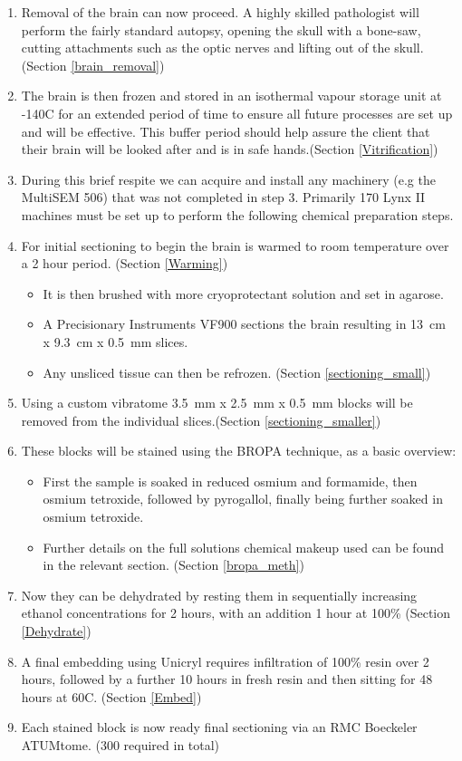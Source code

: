 \documentclass[a4paper, 11pt]{article}
\numberwithin{equation}{section}
\begin{document}
\begin{enumerate}
	
	\item Removal of the brain can now proceed. A highly skilled pathologist will perform the fairly standard autopsy, opening the skull with a bone-saw, cutting attachments such as the optic nerves and lifting out of the skull. (Section \ref{brain_removal})
	\item The brain is then frozen and stored in an isothermal vapour storage unit at -140\degree C for an extended period of time to ensure all future processes are set up and will be effective. This buffer period should help assure the client that their brain will be looked after and is in safe hands.(Section \ref{Vitrification})
	\item During this brief respite we can acquire and install any machinery (e.g the MultiSEM 506) that was not completed in step 3. Primarily 170 Lynx II machines must be set up to perform the following chemical preparation steps.
	
	\item For initial sectioning to begin the brain is warmed to room temperature over a 2 hour period. (Section \ref{Warming})
	\begin{itemize}
		\item It is then brushed with more cryoprotectant solution and set in agarose.
		\item A Precisionary Instruments VF900 sections the brain resulting in \SI{13}{\centi\meter} x \SI{9.3}{\centi\meter} x \SI{0.5}{\milli\meter} slices.
		\item Any unsliced tissue can then be refrozen. (Section \ref{sectioning_small})
	\end{itemize}
	
	
	
	\item Using a custom vibratome \SI{3.5}{\milli\meter} x \SI{2.5}{\milli\meter} x \SI{0.5}{\milli\meter} blocks will be removed from the individual slices.(Section \ref{sectioning_smaller})
	\item These blocks will be stained using the BROPA technique, as a basic overview:
	\begin{itemize} 
		\item First the sample is soaked in reduced osmium and formamide, then osmium tetroxide, followed by pyrogallol, finally being further soaked in osmium tetroxide. 
		\item Further details on the full solutions chemical makeup used can be found in the relevant section. (Section \ref{bropa_meth})
    \end{itemize}
	\item Now they can be dehydrated by resting them in sequentially increasing ethanol concentrations for 2 hours, with an addition 1 hour at 100\% (Section \ref{Dehydrate})
	\item A final embedding using Unicryl requires infiltration of 100\% resin over 2 hours, followed by a further 10 hours in fresh resin and then sitting for 48 hours at 60\degree C. (Section \ref{Embed})
	\item Each stained block is now ready final sectioning via an RMC Boeckeler ATUMtome. (300 required in total)
	\begin{itemize}
		

\end{itemize}
\end{enumerate}
\end{document}
